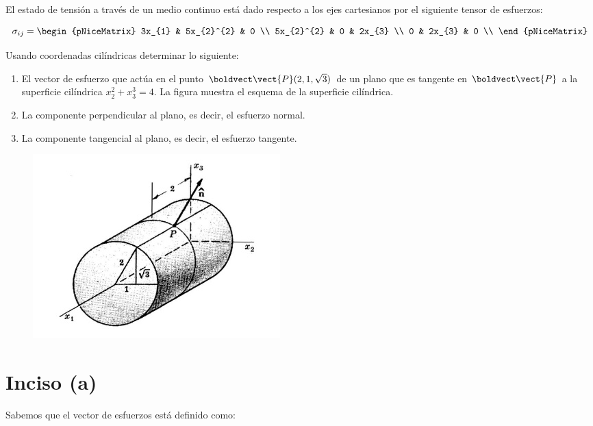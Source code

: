 \documentclass[../main.tex]{subfiles}
\begin{document}
\begin{problema}
	El estado de tensión a través de un medio continuo está dado respecto
	a los ejes cartesianos por el siguiente tensor de esfuerzos:

	\begin{equation*}
		\sigma_{ij} =
		\begin{pNiceMatrix}
			3x_{1}     & 5x_{2}^{2} & 0      \\
			5x_{2}^{2} & 0          & 2x_{3} \\
			0          & 2x_{3}     & 0      \\
		\end{pNiceMatrix}
	\end{equation*}

	Usando coordenadas cilíndricas determinar lo siguiente:

	\begin{enumerate}
		\item El vector de esfuerzo que actúa en el punto \(\boldvect\vect{P}(2, 1, \sqrt{3})\) de
		      un plano que es tangente en \(\boldvect\vect{P}\) a la superficie cilíndrica
		      \(x_{2}^{2} + x_{3}^{3} = 4\). La figura muestra el esquema de la superficie
		      cilíndrica.
		\item La componente perpendicular al plano, es decir, el esfuerzo normal.
		\item La componente tangencial al plano, es decir, el esfuerzo tangente.
	\end{enumerate}

	\begin{figure}[htb]
		\centering
		\includegraphics[scale=.4]{figs/problema02-001.jpg}
	\end{figure}
\end{problema}

\startsolution

\section{Inciso (a)}
Sabemos que el vector de esfuerzos está definido como:
\end{document}
